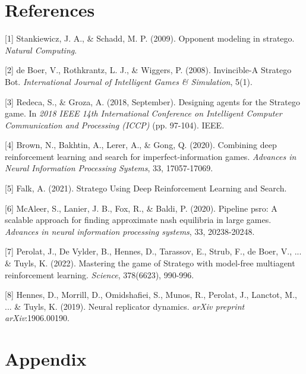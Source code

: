 \documentclass{article}
\begin{document}
\section*{References}

\small

[1] Stankiewicz, J. A., \& Schadd, M. P. (2009). Opponent modeling in stratego. \textit{Natural Computing}.

[2] de Boer, V., Rothkrantz, L. J., \& Wiggers, P. (2008). Invincible-A Stratego Bot. \textit{International Journal of Intelligent Games \& Simulation}, 5(1).

[3] Redeca, S., \& Groza, A. (2018, September). Designing agents for the Stratego game. In \textit{2018 IEEE 14th International Conference on Intelligent Computer Communication and Processing (ICCP)} (pp. 97-104). IEEE.

[4] Brown, N., Bakhtin, A., Lerer, A., \& Gong, Q. (2020). Combining deep reinforcement learning and search for imperfect-information games. \textit{Advances in Neural Information Processing Systems}, 33, 17057-17069.

[5] Falk, A. (2021). Stratego Using Deep Reinforcement Learning and Search.

[6] McAleer, S., Lanier, J. B., Fox, R., \& Baldi, P. (2020). Pipeline psro: A scalable approach for finding approximate nash equilibria in large games. \textit{Advances in neural information processing systems}, 33, 20238-20248.

[7] Perolat, J., De Vylder, B., Hennes, D., Tarassov, E., Strub, F., de Boer, V., ... \& Tuyls, K. (2022). Mastering the game of Stratego with model-free multiagent reinforcement learning. \textit{Science}, 378(6623), 990-996.

[8] Hennes, D., Morrill, D., Omidshafiei, S., Munos, R., Perolat, J., Lanctot, M., ... \& Tuyls, K. (2019). Neural replicator dynamics. \textit{arXiv preprint arXiv}:1906.00190.

\section*{Appendix}
\end{document}
